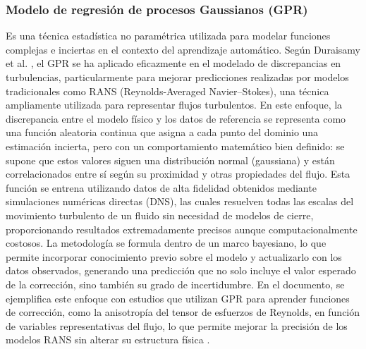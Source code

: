 \documentclass[11pt]{report}
\begin{document}
\subsubsection{Modelo de regresión de procesos Gaussianos (GPR)}

Es una técnica estadística no paramétrica utilizada para modelar funciones complejas e inciertas en el contexto del aprendizaje automático. Según Duraisamy et al. \cite{duraisamy2019turbulence}, el GPR se ha aplicado eficazmente en el modelado de discrepancias en turbulencias, particularmente para mejorar predicciones realizadas por modelos tradicionales como RANS (Reynolds-Averaged Navier–Stokes), una técnica ampliamente utilizada para representar flujos turbulentos. En este enfoque, la discrepancia entre el modelo físico y los datos de referencia se representa como una función aleatoria continua que asigna a cada punto del dominio una estimación incierta, pero con un comportamiento matemático bien definido: se supone que estos valores siguen una distribución normal (gaussiana) y están correlacionados entre sí según su proximidad y otras propiedades del flujo. Esta función se entrena utilizando datos de alta fidelidad obtenidos mediante simulaciones numéricas directas (DNS), las cuales resuelven todas las escalas del movimiento turbulento de un fluido sin necesidad de modelos de cierre, proporcionando resultados extremadamente precisos aunque computacionalmente costosos. La metodología se formula dentro de un marco bayesiano, lo que permite incorporar conocimiento previo sobre el modelo y actualizarlo con los datos observados, generando una predicción que no solo incluye el valor esperado de la corrección, sino también su grado de incertidumbre. En el documento, se ejemplifica este enfoque con estudios que utilizan GPR para aprender funciones de corrección, como la anisotropía del tensor de esfuerzos de Reynolds, en función de variables representativas del flujo, lo que permite mejorar la precisión de los modelos RANS sin alterar su estructura física \cite{duraisamy2019turbulence}.
\end{document}
